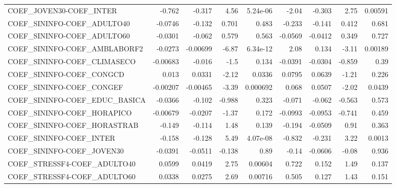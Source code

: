 \begin{tabular}{lrrrrrrrr}
COEF\_JOVEN30-COEF\_INTER               &      -0.762 &       -0.317 &     4.56 & 5.24e-06 &      -2.04 &      -0.303 &         2.75 &       0.00591 \\
COEF\_SININFO-COEF\_ADULTO40            &     -0.0746 &       -0.132 &    0.701 &    0.483 &     -0.233 &      -0.141 &        0.412 &         0.681 \\
COEF\_SININFO-COEF\_ADULTO60            &     -0.0301 &       -0.062 &    0.579 &    0.563 &    -0.0569 &     -0.0412 &        0.349 &         0.727 \\
COEF\_SININFO-COEF\_AMBLABORF2          &     -0.0273 &     -0.00699 &    -6.87 & 6.34e-12 &       2.08 &       0.134 &        -3.11 &       0.00189 \\
COEF\_SININFO-COEF\_CLIMASECO           &    -0.00683 &       -0.016 &     -1.5 &    0.134 &    -0.0391 &     -0.0304 &       -0.859 &          0.39 \\
COEF\_SININFO-COEF\_CONGCD              &       0.013 &       0.0331 &    -2.12 &   0.0336 &     0.0795 &      0.0639 &        -1.21 &         0.226 \\
COEF\_SININFO-COEF\_CONGEF              &    -0.00207 &     -0.00465 &    -3.39 & 0.000692 &      0.068 &      0.0507 &        -2.02 &        0.0439 \\
COEF\_SININFO-COEF\_EDUC\_BASICA         &     -0.0366 &       -0.102 &   -0.988 &    0.323 &     -0.071 &      -0.062 &       -0.563 &         0.573 \\
COEF\_SININFO-COEF\_HORAPICO            &    -0.00679 &      -0.0207 &    -1.37 &    0.172 &    -0.0993 &     -0.0953 &       -0.741 &         0.459 \\
COEF\_SININFO-COEF\_HORASTRAB           &      -0.149 &       -0.114 &     1.48 &    0.139 &     -0.194 &     -0.0509 &         0.91 &         0.363 \\
COEF\_SININFO-COEF\_INTER               &      -0.158 &       -0.128 &     5.49 & 4.07e-08 &     -0.832 &      -0.231 &         3.22 &        0.0013 \\
COEF\_SININFO-COEF\_JOVEN30             &     -0.0391 &      -0.0511 &   -0.138 &     0.89 &      -0.14 &     -0.0606 &        -0.08 &         0.936 \\
COEF\_STRESSF4-COEF\_ADULTO40           &      0.0599 &       0.0419 &     2.75 &  0.00604 &      0.722 &       0.152 &         1.49 &         0.137 \\
COEF\_STRESSF4-COEF\_ADULTO60           &      0.0338 &       0.0275 &     2.69 &  0.00716 &      0.505 &       0.127 &         1.43 &         0.151 \\

\end{tabular}
